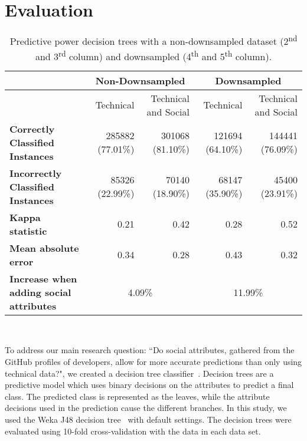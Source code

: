 \documentclass[10pt, conference]{IEEEtran}
\begin{document}
\section{Evaluation} \label{eval}
\begin{table*}[ht]
\centering
\begin{tabular}{l||r|r||r|r}
  & \multicolumn{2}{|c||}{Non-Downsampled}  & \multicolumn{2}{|c}{Downsampled} \\
\hline
  & Technical & Technical and Social & Technical & Technical and Social \\
\hline
	\textbf{Correctly Classified Instances}&  285882 (77.01\%) & 301068
	(81.10\%)  & 121694 (64.10\%) & 144441 (76.09\%)\\

	\textbf{Incorrectly Classified Instances}&  85326 (22.99\%) & 70140
	(18.90\%) & 68147 (35.90\%) &  45400 (23.91\%)\\

\textbf{Kappa statistic}& 0.21 &  0.42 & 0.28  & 0.52 \\

\textbf{Mean absolute error}& 0.34 &  0.28 & 0.43 & 0.32\\

\hline
\textbf{Increase when adding social attributes}& \multicolumn{2}{|c||}{4.09\%}  & \multicolumn{2}{|c}{11.99\%}\\

\hline
\end{tabular}
\\
\center
	\caption{\label{resultsTable} Predictive power 
      decision trees with a non-downsampled dataset
	(2\textsuperscript{nd} and 3\textsuperscript{rd} column) and downsampled
	(4\textsuperscript{th} and 5\textsuperscript{th} column). 
	}   
\end{table*}
To address our main research question: ``Do social attributes, gathered 
from the GitHub profiles of developers,
allow for more accurate predictions than only using technical data?", we 
created a decision tree classifier~\cite{Quinlan86}.
Decision trees are a predictive model which uses binary decisions on the
attributes to predict a final class.  The predicted class is represented as the
leaves, while the attribute decisions used in the prediction cause the
different branches.
In this study, we used the Weka J48 decision tree~\cite{Weka,Quinlan1993}
with default settings. The decision trees were evaluated using 10-fold 
cross-validation with the data in each data set.
\end{document}
